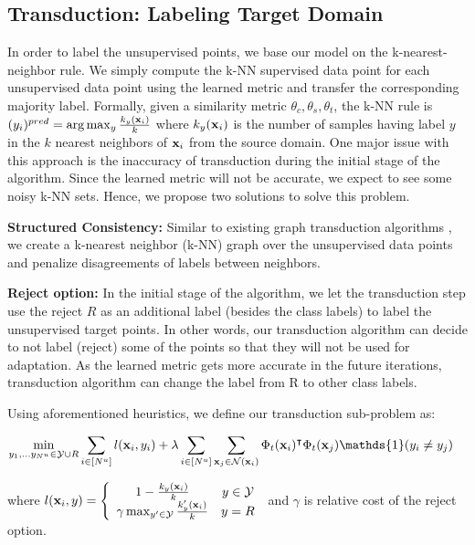 \subsection{Transduction: Labeling Target Domain}
\label{label}
In order to label the unsupervised points, we base our model on the k-nearest-neighbor rule. We simply compute the k-NN supervised data point for each unsupervised data point using the learned metric and transfer the corresponding majority label. Formally, given a similarity metric $\theta_c, \theta_s, \theta_t$, the k-NN rule is 
$(y_i)^{pred} = \arg\max_y \frac{k_y(\mathbf{x}_i)}{k}$ where $k_y(\mathbf{x}_i)$ is the number of samples having label $y$ in the $k$ nearest neighbors of $\mathbf{x}_i$ from the source domain. One major issue with this approach is the inaccuracy of transduction during the initial stage of the algorithm. Since the learned metric will not be accurate, we expect to see some noisy k-NN sets. Hence, we propose two solutions to solve this problem.

\textbf{Structured Consistency:} Similar to existing graph transduction algorithms \cite{label_prop1,label_prop2}, we create a k-nearest neighbor (k-NN) graph over the unsupervised data points and penalize disagreements of labels between neighbors.

\textbf{Reject option:} In the initial stage of the algorithm, we let the transduction step use the reject $R$ as an additional label (besides the class labels) to label the unsupervised target points. In other words, our transduction algorithm can decide to not label (reject) some of the points so that they will not be used for adaptation. As the learned metric gets more accurate in the future iterations, transduction algorithm can change the label from R to other class labels. 

Using aforementioned heuristics, we define our transduction sub-problem as:

\begin{equation}
\begin{aligned}
\min_{y_1, \ldots y_{N^u} \in \mathcal{Y} \cup R}  &\sum_{i \in [N^u]} l(\xui, y_i) + \lambda \sum_{i \in [N^u]} \sum_{\xuj \in \mathcal{N}(\xui)} \Phi_t(\xui)^\intercal \Phi_t(\xuj)\mathds{1}(y_i \neq y_j)
\end{aligned}
\label{robtran}
\end{equation}

where $l(\mathbf{x}_i, y) = \left\{ \begin{array}{cc}  1 - \frac{k_y(\mathbf{x}_i)}{k} & y \in \mathcal{Y} \\ \gamma \max_{y^\prime \in \mathcal{Y}} \frac{k_y^\prime(\mathbf{x}_i)}{k}
 & y=R \end{array}\right.$ and $\gamma$ is relative cost of the reject option. 
 

